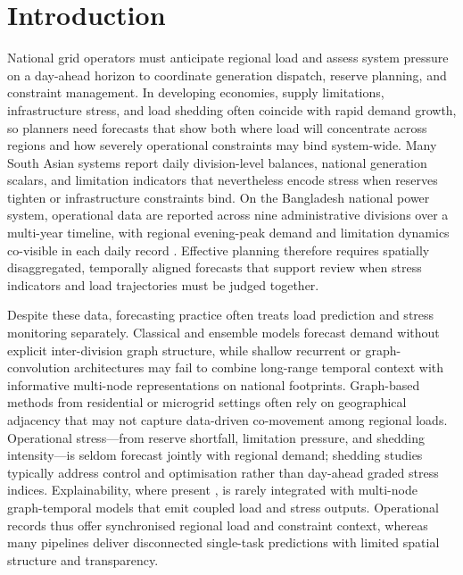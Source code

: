 \section{Introduction}\label{sec:introduction}

National grid operators must anticipate regional load and assess system pressure on a day-ahead horizon to coordinate generation dispatch, reserve planning, and constraint management. In developing economies, supply limitations, infrastructure stress, and load shedding often coincide with rapid demand growth, so planners need forecasts that show both where load will concentrate across regions and how severely operational constraints may bind system-wide. Many South Asian systems report daily division-level balances, national generation scalars, and limitation indicators that nevertheless encode stress when reserves tighten or infrastructure constraints bind. On the Bangladesh national power system, operational data are reported across nine administrative divisions over a multi-year timeline, with regional evening-peak demand and limitation dynamics co-visible in each daily record \cite{Hossain2025BangladeshSmartGrid}. Effective planning therefore requires spatially disaggregated, temporally aligned forecasts that support review when stress indicators and load trajectories must be judged together.

Despite these data, forecasting practice often treats load prediction and stress monitoring separately. Classical and ensemble models \cite{Breiman2001RandomForest,Chen2016XGBoost,Musbah2025LoadForecasting} forecast demand without explicit inter-division graph structure, while shallow recurrent or graph-convolution architectures \cite{Hochreiter1997LSTM,Yu2018STGCN} may fail to combine long-range temporal context with informative multi-node representations on national footprints. Graph-based methods \cite{Kipf2017GCN,Wu2023TransferLearningGNN,Shi2024EVChargingGNN} from residential or microgrid settings often rely on geographical adjacency that may not capture data-driven co-movement among regional loads. Operational stress---from reserve shortfall, limitation pressure, and shedding intensity---is seldom forecast jointly with regional demand; shedding studies \cite{Paphitis2025SpatialLoadShedding,Wang2026SHAPLoadShedding} typically address control and optimisation rather than day-ahead graded stress indices. Explainability, where present \cite{Baur2024XAIReview,Cifci2025InterpretableSmartGrid}, is rarely integrated with multi-node graph-temporal models that emit coupled load and stress outputs. Operational records thus offer synchronised regional load and constraint context, whereas many pipelines deliver disconnected single-task predictions with limited spatial structure and transparency.

